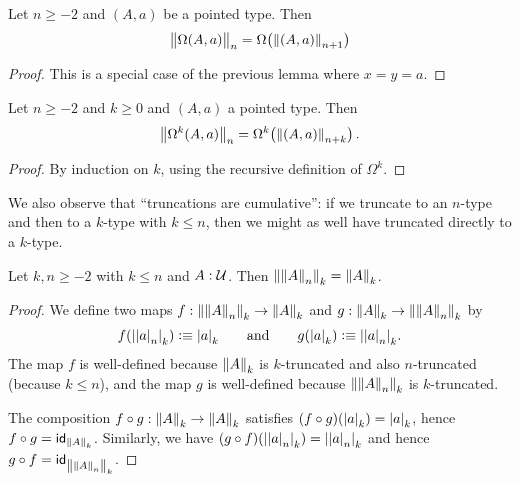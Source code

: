 \begin{cor}
  Let $n\ge-2$ and $(A,a)$ be a pointed type. Then
  \[\ttrunc n{\Omega(A,a)}=\Omega\mathopen{}\left(\trunc{n+1}{(A,a)}\right)\]
\end{cor}
\begin{proof}
  This is a special case of the previous lemma where $x=y=a$.
\end{proof}

\begin{cor}
  Let $n\ge -2$ and $k\ge 0$ and $(A,a)$ a pointed type.  Then
  \[\ttrunc n{\Omega^k(A,a)} = \Omega^k\mathopen{}\left(\trunc{n+k}{(A,a)}\right). \]
\end{cor}
\begin{proof}
  By induction on $k$, using the recursive definition of $\Omega^k$.
\end{proof}

We also observe that ``truncations are cumulative'': if we truncate to an $n$-type and then to a $k$-type with $k\le n$, then we might as
well have truncated directly to a $k$-type.

\begin{lem} \label{lem:truncation-le}
  Let $k,n\ge-2$ with $k\le{}n$ and $A:\type$. Then
  $\trunc k{\trunc nA}=\trunc kA$.
\end{lem}
\begin{proof}
  We define two maps $f:\trunc k{\trunc nA}\to\trunc kA$ and
  $g:\trunc kA\to\trunc k{\trunc nA}$ by
  \[
   f(\tproj k{\tproj na}) \defeq \tproj ka
   \qquad\text{and}\qquad
   g(\tproj ka) \defeq \tproj k{\tproj na}.
  \]
  The map $f$ is well-defined because $\trunc kA$ is $k$-truncated and also
  $n$-truncated (because $k\le{}n$), and the map $g$ is well-defined because
  $\trunc k{\trunc nA}$ is $k$-truncated.

  The composition $f\circ{}g:\trunc kA\to\trunc kA$ satisfies
  $(f\circ{}g)(\tproj ka)=\tproj ka$, hence $f\circ{}g=\idfunc[\trunc kA]$.
  Similarly, we have $(g\circ{}f)(\tproj k{\tproj na})=\tproj k{\tproj na}$ and hence $g\circ{}f=\idfunc[\trunc k{\trunc nA}]$.
\end{proof}



